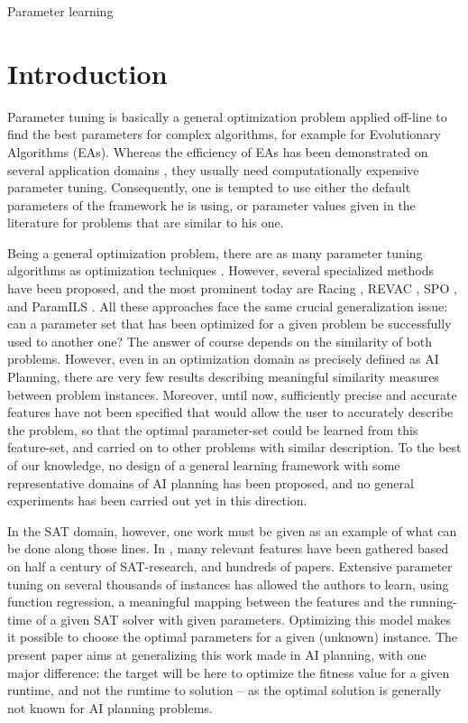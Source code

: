 \documentclass{MYsig-alternate}
\begin{document}
 {Parameter learning}





\section{Introduction}

Parameter tuning is basically a general optimization problem applied off-line to find the best parameters for complex algorithms, for example for Evolutionary Algorithms (EAs). Whereas the efficiency of EAs has been demonstrated on several application domains \cite{practice08,ParameterSettingBook07}, they usually need computationally expensive parameter tuning. Consequently, one is tempted to use either the default parameters of the framework he is using, or parameter values given in the literature for problems that are similar to his one. 

Being a general optimization problem, there are as many parameter tuning algorithms as optimization techniques \cite{Eiben2007,Montero:2010}. However, several specialized methods have been proposed, and the most prominent today are Racing \cite{birattari2002}, REVAC \cite{Nannen07}, SPO \cite{SPO:CEC05}, and ParamILS \cite{ParamILS-JAIR}. All these approaches face the same crucial generalization issue: can a parameter set that has been optimized for a given problem be successfully used to another one? The answer of course depends on the similarity of both problems. However, even in an optimization domain as precisely defined as AI Planning, there are very few results describing meaningful similarity measures between problem instances. Moreover, until now, sufficiently precise and accurate features have not been specified that would allow the user to accurately describe the problem, so that the optimal parameter-set could be learned from this feature-set, and carried on to other problems with similar description. To the best of our knowledge, no design of a general learning framework with some representative domains of AI planning has been proposed, and no general experiments has been carried out yet in this direction.

In the SAT domain, however, one work must be given as an example of what can be done along those lines. In \cite{Hutter06}, many relevant features have been gathered based on half a century of SAT-research, and hundreds of papers. Extensive parameter tuning on several thousands of instances has allowed the authors to learn, using function regression, a meaningful mapping between the features and the running-time of a given SAT solver with given parameters. Optimizing this model makes it possible to choose the optimal parameters for a given (unknown) instance. The present paper aims at generalizing this work made in AI planning, with one major difference: the target will be here to optimize the fitness value for a given runtime, and not the runtime to solution -- as the optimal solution is generally not known for AI planning problems. 
\end{document}
